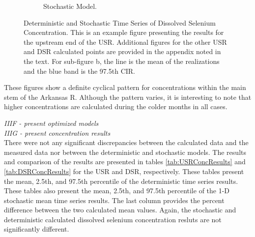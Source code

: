\begin{linenumbers}
\begin{figure}[htbp]
\begin{subfigure}{0.5\textwidth}
		\caption{Stochastic Model.}
		\label{sub:ExSCSeTS}
	\end{subfigure}
	\caption[Deterministic and Stochastic Time Series of Dissolved Selenium Concentration.]{Deterministic and Stochastic Time Series of Dissolved Selenium Concentration.  This is an example figure presenting the results for the upstream end of the USR.  Additional figures for the other USR and DSR calculated points are provided in the appendix noted in the text.  For sub-figure b, the line is the mean of the realizations and the blue band is the 97.5th CIR.}
	\label{fig:ExCSeTS}
\end{figure}

These figures show a definite cyclical pattern for concentrations within the main stem of the Arkansas R.  Although the pattern varies, it is interesting to note that higher concentrations are calculated during the colder months in all cases.

\emph{IIIF - present optimized models}\\

\emph{IIIG - present concentration results}\\

There were not any significant discrepancies between the calculated data and the measured data nor between the deterministic and stochastic models.  The results and comparison of the results are presented in tables \ref{tab:USRConcResults} and \ref{tab:DSRConcResults} for the USR and DSR, respectively.  These tables present the mean, 2.5th, and 97.5th percentile of the deterministic time series results.  These tables also present the mean, 2.5th, and 97.5th percentile of the 1-D stochastic mean time series results.  The last column provides the percent difference between the two calculated mean values.  Again, the stochastic and deterministic calculated dissolved selenium concentration resluts are not significantly different.


\end{linenumbers}

